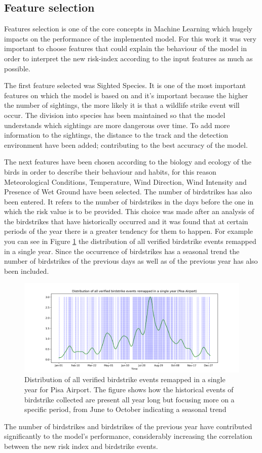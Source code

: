 \subsection{Feature selection}
Features selection is one of the core concepts in Machine Learning which hugely impacts on the performance of the implemented model.
For this work it was very important to choose features that could explain the behaviour of the model in order to interpret the new risk-index according to the input features as much as possible.

The first feature selected was Sighted Species. It is one of the most important features on which the model is based on and it's important because the higher the number of sightings, the more likely it is that a wildlife strike event will occur. The division into species has been maintained so that the model understands which sightings are more dangerous over time.
To add more information to the sightings, the distance to the track and the detection environment have been added; contributing to the best accuracy of the model.

The next features have been chosen according to the biology and ecology of the birds in order to describe their behaviour and habits, for this reason Meteorological Conditions, Temperature, Wind Direction, Wind Intensity and Presence of Wet Ground have been selected.
The number of birdstrikes has also been entered. It refers to the number of birdstrikes in the days before the one in which the risk value is to be provided.
This choice was made after an analysis of the birdstrikes that have historically occurred and it was found that at certain periods of the year there is a greater tendency for them to happen.
For example you can see in Figure \ref{bird_distrib} the distribution of all verified birdstrike events remapped in a single year.
Since the occurrence of birdstrikes has a seasonal trend the number of birdstrikes of the previous days as well as of the previous year has also been included.
\begin{figure}
	\centering
	\includegraphics[width=13.8cm]{img/plot_distrib.png}
	\caption{Distribution of all verified birdstrike events remapped in a single year for Pisa Airport. The figure shows how the historical events of birdstrike collected are present all year long but focusing more on a specific period, from June to October indicating a seasonal trend}
	\label{bird_distrib}
\end{figure}
The number of birdstrikes and birdstrikes of the previous year have contributed significantly to the model's performance, considerably increasing the correlation between the new risk index and birdstrike events.

